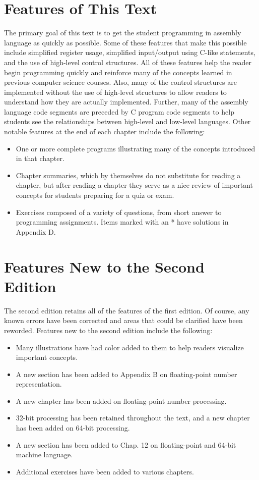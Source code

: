 \documentclass[10pt]{article}
\begin{document}
\section*{Features of This Text}
The primary goal of this text is to get the student programming in assembly language as quickly as possible. Some of these features that make this possible include simplified register usage, simplified input/output using C-like statements, and the use of high-level control structures. All of these features help the reader begin programming quickly and reinforce many of the concepts learned in previous computer science courses. Also, many of the control structures are implemented without the use of high-level structures to allow readers to understand how they are actually implemented. Further, many of the assembly language code segments are preceded by C program code segments to help students see the relationships between high-level and low-level languages. Other notable features at the end of each chapter include the following:

\begin{itemize}
  \item One or more complete programs illustrating many of the concepts introduced in that chapter.
  \item Chapter summaries, which by themselves do not substitute for reading a chapter, but after reading a chapter they serve as a nice review of important concepts for students preparing for a quiz or exam.
  \item Exercises composed of a variety of questions, from short answer to programming assignments. Items marked with an * have solutions in Appendix D.
\end{itemize}

\section*{Features New to the Second Edition}
The second edition retains all of the features of the first edition. Of course, any known errors have been corrected and areas that could be clarified have been reworded. Features new to the second edition include the following:

\begin{itemize}
  \item Many illustrations have had color added to them to help readers visualize important concepts.
  \item A new section has been added to Appendix B on floating-point number representation.
  \item A new chapter has been added on floating-point number processing.
  \item 32-bit processing has been retained throughout the text, and a new chapter has been added on 64-bit processing.
  \item A new section has been added to Chap. 12 on floating-point and 64-bit machine language.
  \item Additional exercises have been added to various chapters.
\end{itemize}
\end{document}
